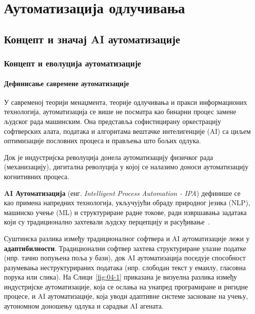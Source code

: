\chapter{Аутоматизација одлучивања}
\label{ch:automatizacija}

\section{Концепт и значај AI аутоматизације}

\subsection{Концепт и еволуција аутоматизације}

\subsubsection{Дефинисање савремене аутоматизације}

У савременој теорији менаџмента, теорије одлучивања и пракси информационих технологија, аутоматизација се више не посматра као бинарни процес замене људског рада машинским. Она представља софистицирану оркестрацију софтверских алата, података и алгоритама вештачке интелигенције (AI) са циљем оптимизације пословних процеса и прављења што бољих одлука.

Док је индустријска револуција донела аутоматизацију физичког рада (механизацију), дигитална револуција у којој се налазимо доноси аутоматизацију когнитивних процеса.

\begin{tcolorbox}[colback=gray!10!white,colframe=blue!50!black,title=Формална дефиниција]
\textbf{AI Аутоматизација} (енг. \textit{Intelligent Process Automation - IPA}) дефинише се као примена напредних технологија, укључујући обраду природног језика (NLP), машинско учење (ML) и структуриране радне токове, ради извршавања задатака који су традиционално захтевали људску перцепцију и расуђивање~\cite{russell2020,goodfellow2016}.
\end{tcolorbox}

Суштинска разлика између традиционалног софтвера и AI аутоматизације лежи у \textbf{адаптибилности}. Традиционални софтвер захтева структуриране улазне податке (нпр. тачно попуњена поља у бази), док AI аутоматизација поседује способност разумевања неструктурираних података (нпр. слободан текст у емаилу, гласовна порука или слика).
На Слици~\ref{fig:04-1} приказана је визуелна разлика између индустријске аутоматизације, која се ослања на унапред програмиране и ригидне процесе, и AI аутоматизације, која уводи адаптивне системе засноване на учењу, аутономном доношењу одлука и сарадњи AI агената.

